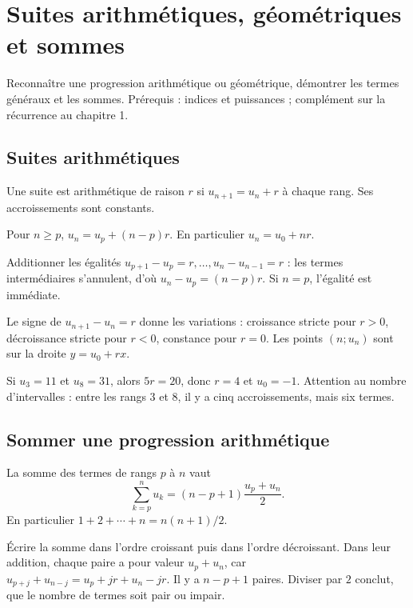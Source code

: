 \documentclass[../cours_1re.tex]{subfiles}
\begin{document}
\setcounter{chapter}{4}
\chapter{Suites arithmétiques, géométriques et sommes}
\label{ch:05}
\begin{objectif}
Reconnaître une progression arithmétique ou géométrique, démontrer les termes généraux et les sommes. Prérequis : indices et puissances ; complément sur la récurrence au chapitre 1.
\end{objectif}
\section{Suites arithmétiques}
\begin{definition}
Une suite est arithmétique de raison $r$ si $u_{n+1}=u_n+r$ à chaque rang. Ses accroissements sont constants.
\end{definition}
\begin{theoreme}
Pour $n\ge p$, $u_n=u_p+(n-p)r$. En particulier $u_n=u_0+nr$.
\end{theoreme}
\begin{demonstration}
Additionner les égalités $u_{p+1}-u_p=r,\ldots,u_n-u_{n-1}=r$ : les termes intermédiaires s'annulent, d'où $u_n-u_p=(n-p)r$. Si $n=p$, l'égalité est immédiate.
\end{demonstration}
Le signe de $u_{n+1}-u_n=r$ donne les variations : croissance stricte pour $r>0$, décroissance stricte pour $r<0$, constance pour $r=0$. Les points $(n;u_n)$ sont sur la droite $y=u_0+rx$.
\begin{exemple}
Si $u_3=11$ et $u_8=31$, alors $5r=20$, donc $r=4$ et $u_0=-1$. Attention au nombre d'intervalles : entre les rangs $3$ et $8$, il y a cinq accroissements, mais six termes.
\end{exemple}
\section{Sommer une progression arithmétique}
\begin{theoreme}
La somme des termes de rangs $p$ à $n$ vaut
\[
\sum_{k=p}^{n}u_k=(n-p+1)\frac{u_p+u_n}{2}.
\]
En particulier $1+2+\cdots+n=n(n+1)/2$.
\end{theoreme}
\begin{demonstration}
Écrire la somme dans l'ordre croissant puis dans l'ordre décroissant. Dans leur addition, chaque paire a pour valeur $u_p+u_n$, car
$u_{p+j}+u_{n-j}=u_p+jr+u_n-jr$. Il y a $n-p+1$ paires. Diviser par $2$ conclut, que le nombre de termes soit pair ou impair.
\end{demonstration}
\end{document}
